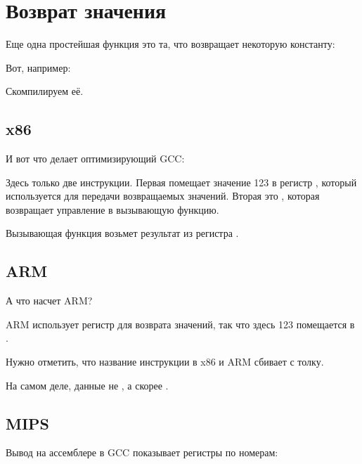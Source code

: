 \section{Возврат значения}
\label{ret_val_func}

Еще одна простейшая функция это та, что возвращает некоторую константу:

Вот, например:



Скомпилируем её.

\subsection{x86}

И вот что делает оптимизирующий GCC:



Здесь только две инструкции. Первая помещает значение 123 в регистр \EAX, который используется
для передачи возвращаемых значений. Вторая это \RET, которая возвращает управление в вызывающую функцию.

Вызывающая функция возьмет результат из регистра \EAX.

\subsection{ARM}

А что насчет ARM?



ARM использует регистр  для возврата значений, так что здесь 123 помещается в .

Нужно отметить, что название инструкции \MOV в x86 и ARM сбивает с толку.

На самом деле, данные не , а скорее .

\subsection{MIPS}

\label{MIPS_leaf_function_ex1}
Вывод на ассемблере в GCC показывает регистры по номерам:

